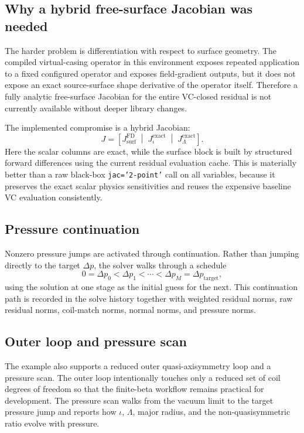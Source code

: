 \documentclass[11pt]{article}
\begin{document}
\subsection{Why a hybrid free-surface Jacobian was needed}
The harder problem is differentiation with respect to surface geometry. The compiled virtual-casing operator in this environment exposes repeated application to a fixed configured operator and exposes field-gradient outputs, but it does not expose an exact source-surface shape derivative of the operator itself. Therefore a fully analytic free-surface Jacobian for the entire VC-closed residual is not currently available without deeper library changes.

The implemented compromise is a hybrid Jacobian:
\begin{equation}
  J = \left[ J_{\mathrm{surf}}^{\mathrm{FD}} \;\middle|\; J_{\iota}^{\mathrm{exact}} \;\middle|\; J_{\Lambda}^{\mathrm{exact}} \right].
\end{equation}
Here the scalar columns are exact, while the surface block is built by structured forward differences using the current residual evaluation cache. This is materially better than a raw black-box \texttt{jac='2-point'} call on all variables, because it preserves the exact scalar physics sensitivities and reuses the expensive baseline VC evaluation consistently.

\subsection{Pressure continuation}
Nonzero pressure jumps are activated through continuation. Rather than jumping directly to the target $\Delta p$, the solver walks through a schedule
\begin{equation}
  0 = \Delta p_0 < \Delta p_1 < \cdots < \Delta p_M = \Delta p_{\mathrm{target}},
\end{equation}
using the solution at one stage as the initial guess for the next. This continuation path is recorded in the solve history together with weighted residual norms, raw residual norms, coil-match norms, normal norms, and pressure norms.

\subsection{Outer loop and pressure scan}
The example also supports a reduced outer quasi-axisymmetry loop and a pressure scan. The outer loop intentionally touches only a reduced set of coil degrees of freedom so that the finite-beta workflow remains practical for development. The pressure scan walks from the vacuum limit to the target pressure jump and reports how $\iota$, $\Lambda$, major radius, and the non-quasisymmetric ratio evolve with pressure.
\end{document}
